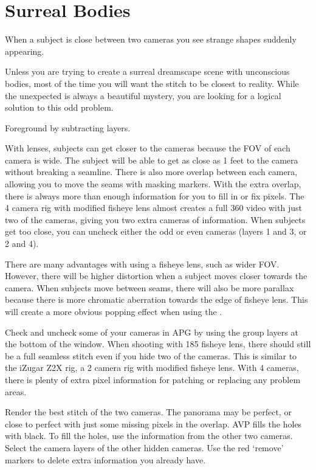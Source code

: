 \chapter{Surreal Bodies}
\pagecolor{white}
\label{chap:39}
\begin{fullwidth}

\problem

{\large When a subject is close between two cameras you see strange shapes suddenly appearing. \par}

Unless you are trying to create a surreal dreamscape scene with unconscious bodies, most of the time you will want the stitch to be closest to reality. While the unexpected is always a beautiful mystery, you are looking for a logical solution to this odd problem.

\clearpage
\solutions

{\large Foreground by subtracting layers. \par}

With \textbf{} lenses, subjects can get closer to the cameras because the FOV of each camera is wide. The subject will be able to get as close as 1 feet to the camera without breaking a seamline. There is also more overlap between each camera, allowing you to move the seams with masking markers. With the extra overlap, there is always more than enough information for you to fill in or fix pixels. The 4 camera rig with modified fisheye lens almost creates a full 360 video with just two of the cameras, giving you two extra cameras of information. When subjects get too close, you can uncheck either the odd or even cameras (layers 1 and 3, or 2 and 4). 


There are many advantages with using a fisheye lens, such as wider FOV. However, there will be higher distortion when a subject moves closer towards the camera. When subjects move between seams, there will also be more parallax because there is more chromatic aberration towards the edge of fisheye lens. This will create a more obvious popping effect when using the \textbf{}.


Check and uncheck some of your cameras in APG by using the group layers at the bottom of the window. When shooting with 185 fisheye lens, there should still be a full seamless stitch even if you hide two of the cameras.  This is similar to the iZugar Z2X rig, a 2 camera rig with modified fisheye lens. With 4 cameras, there is plenty of extra pixel information for patching or replacing any problem areas. 


Render the best stitch of the two cameras. The panorama may be perfect, or close to perfect with just some missing pixels in the overlap. AVP fills the holes with black. To fill the holes, use the information from the other two cameras. Select the camera layers of the other hidden cameras. Use the red ‘remove’ markers to delete extra information you already have.


\clearpage
\end{fullwidth}